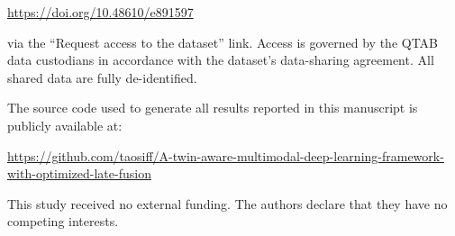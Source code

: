\documentclass[10pt,letterpaper]{article}
\begin{document}
\begin{center}
\url{https://doi.org/10.48610/e891597}
\end{center}

via the ``Request access to the dataset'' link. Access is governed by the QTAB data custodians in accordance with the dataset's data-sharing agreement. All shared data are fully de-identified.

The source code used to generate all results reported in this manuscript is publicly available at:

\begin{center}
\url{https://github.com/taosiff/A-twin-aware-multimodal-deep-learning-framework-with-optimized-late-fusion}
\end{center}

This study received no external funding. The authors declare that they have no competing interests.
                                                                                                                                                                          
\end{document}
